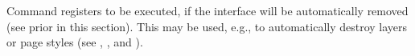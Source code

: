 \begin{Declaration}
\end{Declaration}
Command 
registers  to be executed, if the interface will be automatically
removed (see  prior in this section). This may be
used, e.g., to automatically destroy layers or page styles (see
, , and
).%
\EndIndexGroup
%
\EndIndexGroup




